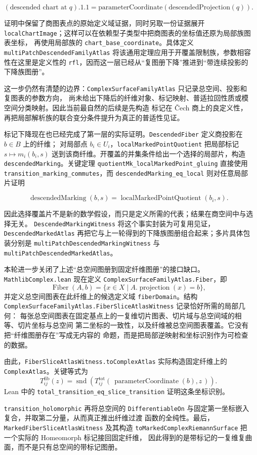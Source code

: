 \documentclass[UTF8,fontset=none,a4paper,11pt]{ctexart}
\begin{document}
\[
  (\text{descended chart at }q).1.1
  =\text{parameterCoordinate}(\text{descendedProjection}(q)).
\]

证明中保留了商图表点的原始定义域证据，同时另取一份证据展开
\texttt{localChartImage}；这样可以在依赖型子类型中把商图表的坐标值还原为局部族图表坐标，
再使用局部族的 \texttt{chart\_base\_coordinate}。具体定义
\texttt{multiPatchDescendedFamilyAtlas} 将该通用定理应用于开覆盖限制族，参数相容性在这里是定义性的
\texttt{rfl}，因而这一层已经从“复图册下降”推进到“带连续投影的下降族图册”。

这一步仍然有清楚的边界：\texttt{ComplexSurfaceFamilyAtlas} 只记录总空间、投影和复图表的参数方向，
尚未给出下降后的纤维对象、标记映射、普适拉回性质或模空间分类映射。因此当前最自然的后续是先构造
标记在 Čech 商上的良定义性，再把局部解析族的联合变分条件提升为真正的普适性见证。

标记下降现在也已经完成了第一层的实际证明。\texttt{DescendedFiber} 定义商投影在 \(b\in B\) 上的纤维；
对局部点 \(b_i\in U_i\)，\texttt{localMarkedPointQuotient} 把局部标记
\(s\mapsto m_i(b_i,s)\) 送到该商纤维。开覆盖的并集条件给出一个选择的局部片，构造
\texttt{descendedMarking}。关键定理
\texttt{quotientMk\_localMarkedPoint\_gluing} 直接使用
\texttt{transition\_marking\_commutes}，而
\texttt{descendedMarking\_eq\_local} 则对任意局部片证明

\[
  \operatorname{descendedMarking}(b,s)
  =\operatorname{localMarkedPointQuotient}(b_i,s).
\]

因此选择覆盖片不是新的数学假设，而只是定义所需的代表；结果在商空间中与选择无关。
\texttt{DescendedMarkingWitness} 将这个事实封装为可复用见证，
\texttt{DescendedMarkedAtlas} 再把它与上一轮得到的下降族图册组合起来；多片具体包装分别是
\texttt{multiPatchDescendedMarkingWitness} 与 \texttt{multiPatchDescendedMarkedAtlas}。

本轮进一步关闭了上述“总空间图册到固定纤维图册”的接口缺口。\texttt{MathlibComplex.lean}
现在定义
\texttt{ComplexSurfaceFamilyAtlas.Fiber}，即
\[
  \operatorname{Fiber}(A,b)=\{x\in X\mid A.\operatorname{projection}(x)=b\},
\]
并定义总空间图表在此纤维上的候选定义域
\texttt{fiberDomain}。结构
\texttt{ComplexSurfaceFamilyAtlas.\allowbreak FiberSliceAtlasWitness} 记录恰好所需的局部几何：
每张总空间图表在固定基点上的一复维切片图表、切片域与总空间域的相等、切片坐标与总空间
第二坐标的一致性，以及纤维被总空间图表覆盖。它没有把“纤维图册存在”写成无内容的
命题，而是把局部逆映射和坐标识别作为可检查的数据。

由此，\texttt{FiberSliceAtlasWitness.\allowbreak toComplexAtlas} 实际构造固定纤维上的
\texttt{ComplexAtlas}。关键等式为
\[
  T^{\mathrm{fib}}_{ij}(z)
  =\operatorname{snd}\!\left(
    T^{\mathrm{tot}}_{ij}(\,\operatorname{parameterCoordinate}(b),z\,)
  \right).
\]
Lean 中的
\texttt{total\_transition\allowbreak\_eq\allowbreak\_slice\allowbreak\_transition} 证明这条坐标识别。\par
\texttt{transition\_holomorphic} 再将总空间的
\texttt{DifferentiableOn} 与固定第一坐标嵌入复合，并取第二分量，从而真正推出纤维过渡
函数的全纯性。最后，\texttt{MarkedFiberSlice\allowbreak AtlasWitness} 及其构造
\texttt{toMarkedComplex\allowbreak RiemannSurface} 把一个实际的 Homeomorph 标记接回固定纤维，
因此得到的是带标记的一复维复曲面，而不是只有总空间的带标记图册。
\end{document}
